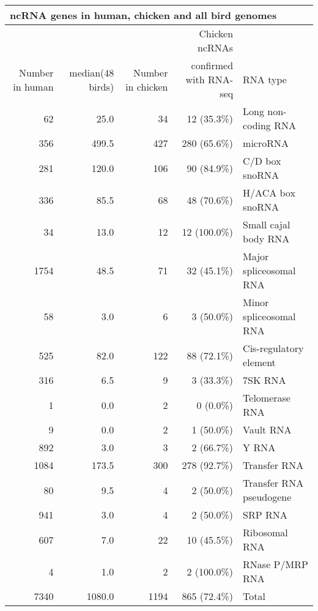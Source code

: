 \documentclass[10pt]{bmc_article}
\newenvironment{bmcformat}{\begin{raggedright}\baselineskip20pt\sloppy\setboolean{publ}{false}}{\end{raggedright}\baselineskip20pt\sloppy}
\begin{document}
\begin{bmcformat}
\begin{table}
\begin{tabular}{|r|r|r|r|l|}
\hline 
\multicolumn{5}{|l|}{{\bf ncRNA genes in human, chicken and all bird genomes}}\\
\hline 
                &                  &                   & Chicken ncRNAs & \\
Number in human & median(48 birds) & Number in chicken & confirmed with RNA-seq & RNA type\\
\hline
62&25.0&34&12 (35.3\%) &Long non-coding RNA\\ 
356&499.5&427&280 (65.6\%) &microRNA\\ 
281&120.0&106&90 (84.9\%) &C/D box snoRNA\\ 
336&85.5&68&48 (70.6\%) &H/ACA box snoRNA\\ 
34&13.0&12&12 (100.0\%) &Small cajal body RNA\\ 
1754&48.5&71&32 (45.1\%) &Major spliceosomal RNA\\ 
58&3.0&6&3 (50.0\%) &Minor spliceosomal RNA\\ 
525&82.0&122&88 (72.1\%) &Cis-regulatory element\\ 
316&6.5&9&3 (33.3\%) &7SK RNA\\ 
1&0.0&2&0 (0.0\%) &Telomerase RNA\\ 
9&0.0&2&1 (50.0\%) &Vault RNA\\ 
892&3.0&3&2 (66.7\%) &Y RNA\\ 
1084&173.5&300&278 (92.7\%) &Transfer RNA\\ 
80&9.5&4&2 (50.0\%) &Transfer RNA pseudogene\\ 
941&3.0&4&2 (50.0\%) &SRP RNA\\ 
607&7.0&22&10 (45.5\%) &Ribosomal RNA\\ 
4&1.0&2&2 (100.0\%) &RNase P/MRP RNA\\ 
\hline
7340&1080.0&1194&865 (72.4\%) &Total\\ 
\hline
\end{tabular}
\caption{}
\label{table:1}
\end{table}


\end{bmcformat}
\end{document}
